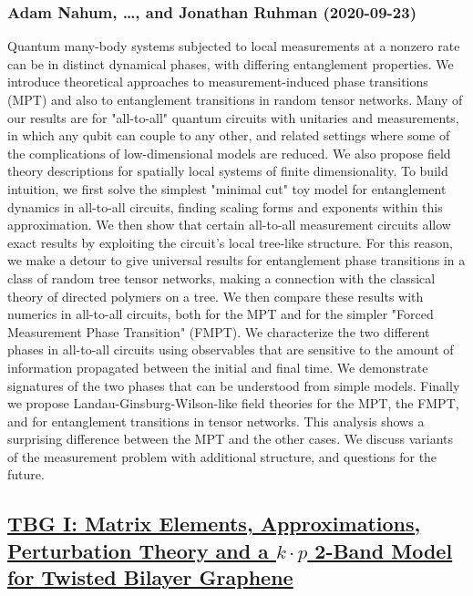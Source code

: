\subsubsection*{Adam Nahum, \dots, and Jonathan Ruhman (2020-09-23)}
Quantum many-body systems subjected to local measurements at a nonzero rate
can be in distinct dynamical phases, with differing entanglement properties. We
introduce theoretical approaches to measurement-induced phase transitions (MPT)
and also to entanglement transitions in random tensor networks. Many of our
results are for "all-to-all" quantum circuits with unitaries and measurements,
in which any qubit can couple to any other, and related settings where some of
the complications of low-dimensional models are reduced. We also propose field
theory descriptions for spatially local systems of finite dimensionality. To
build intuition, we first solve the simplest "minimal cut" toy model for
entanglement dynamics in all-to-all circuits, finding scaling forms and
exponents within this approximation. We then show that certain all-to-all
measurement circuits allow exact results by exploiting the circuit's local
tree-like structure. For this reason, we make a detour to give universal
results for entanglement phase transitions in a class of random tree tensor
networks, making a connection with the classical theory of directed polymers on
a tree. We then compare these results with numerics in all-to-all circuits,
both for the MPT and for the simpler "Forced Measurement Phase Transition"
(FMPT). We characterize the two different phases in all-to-all circuits using
observables that are sensitive to the amount of information propagated between
the initial and final time. We demonstrate signatures of the two phases that
can be understood from simple models. Finally we propose
Landau-Ginsburg-Wilson-like field theories for the MPT, the FMPT, and for
entanglement transitions in tensor networks. This analysis shows a surprising
difference between the MPT and the other cases. We discuss variants of the
measurement problem with additional structure, and questions for the future.

\subsection*{\href{http://arxiv.org/abs/2009.11301v1}{TBG I: Matrix Elements, Approximations, Perturbation Theory and a  $k\cdot p$ 2-Band Model for Twisted Bilayer Graphene}}
